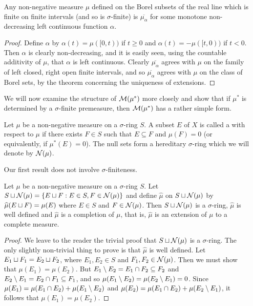 \begin{corollary}
Any non-negative measure $\mu$ defined on the Borel subsets of the real line which is finite on finite intervals (and so is $\sigma$-finite) is $\overline{\mu_\alpha}$ for some monotone non-decreasing left continuous function $\alpha$.
\end{corollary}

\begin{proof}
Define $\alpha$ by $\alpha(t)=\mu([0, t))$ if $t\geq 0$ and $\alpha(t)=-\mu([t, 0))$ if $t<0$. Then $\alpha$ is clearly non-decreasing, and it is easily seen, using the countable additivity of $\mu$, that $\alpha$ is left continuous. Clearly $\overline{\mu_\alpha}$ agrees with $\mu$ on the family of left closed, right open finite intervals, and so $\overline{\mu_\alpha}$ agrees with $\mu$ on the class of Borel sets, by the theorem concerning the uniqueness of extensions.
\end{proof}

We will now examine the structure of ${\cal M}(\mu^*)$ more closely and show that if $\mu^*$ is determined by a $\sigma$-finite premeasure, then ${\cal M}(\mu^*)$ has a rather simple form.

\begin{definition}
Let $\mu$ be a non-negative measure on a $\sigma$-ring $S$. A subset $E$ of $X$ is called a  with respect to $\mu$ if there exists $F\in S$ such that $E\subseteq F$ and $\mu(F)=0$ (or equivalently, if $\mu^*(E)=0$). The null sets form a hereditary $\sigma$-ring which we will denote by ${\cal N}(\mu)$.
\end{definition}

Our first result does not involve $\sigma$-finiteness.

\begin{proposition}\label{prop:null set completion}
Let $\mu$ be a non-negative measure on a $\sigma$-ring $S$. Let $S\sqcup{\cal N}(\mu)=\{E\sqcup F:E\in S,F\in{\cal N}(\mu)\}$ and define $\widehat{\mu}$ on $S\sqcup{\cal N}(\mu)$ by $\widehat{\mu}(E\sqcup F)=\mu(E)$ where $E\in S$ and $F\in{\cal N}(\mu)$. Then $S\sqcup{\cal N}(\mu)$ is a $\sigma$-ring, $\widehat{\mu}$ is well defined and $\widehat{\mu}$ is a completion of $\mu$, that is, $\widehat{\mu}$ is an extension of $\mu$ to a complete measure.
\end{proposition}

\begin{proof}
We leave to the reader the trivial proof that $S\sqcup{\cal N}(\mu)$ is a $\sigma$-ring. The only slightly non-trivial thing to prove is that $\widehat{\mu}$ is well defined. Let $E_1\sqcup F_1=E_2\sqcup F_2$, where $E_1,E_2\in S$ and $F_1,F_2\in{\cal N}(\mu)$. Then we must show that $\mu(E_1)=\mu(E_2)$. But $E_1\setminus E_2=E_1\cap F_2\subseteq F_2$ and $E_2\setminus E_1=E_2\cap F_1\subseteq F_1$, and so $\mu(E_1\setminus E_2)=\mu(E_2\setminus E_1)=0$. Since $\mu(E_1)=\mu(E_1\cap E_2)+\mu(E_1\setminus E_2)$ and $\mu(E_2)=\mu(E_1\cap E_2)+\mu(E_2\setminus E_1)$, it follows that $\mu(E_1)=\mu(E_2)$.

\end{proof}


